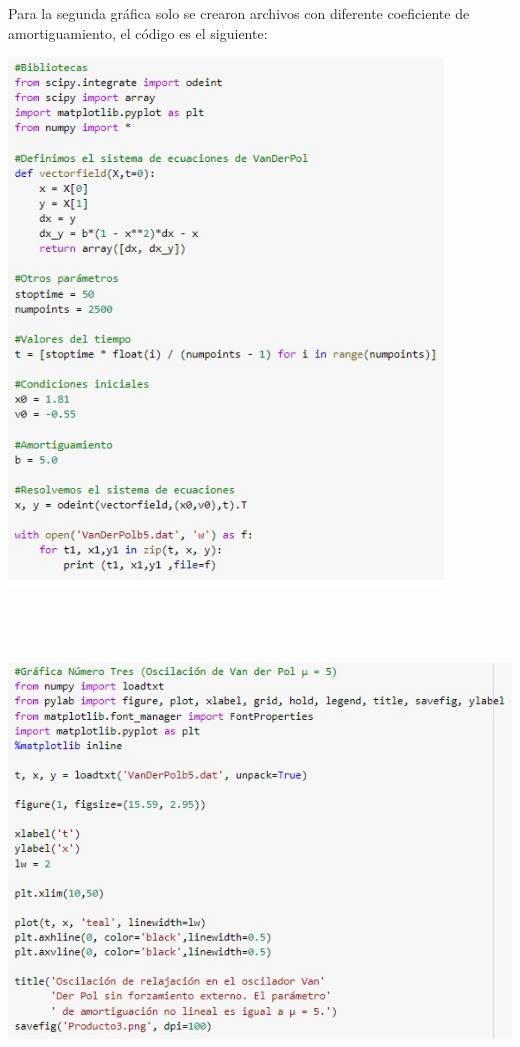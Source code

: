 \documentclass[12pt]{article}
\begin{document}
Para la segunda gráfica solo se crearon archivos con diferente coeficiente de amortiguamiento, el código es el siguiente:
\begin{center}
    \includegraphics[height=14cm]{O3.jpeg}\\
\end{center}
\begin{center}
    \includegraphics[height=13cm]{O4.jpeg}\\
\end{center}
\end{document}
